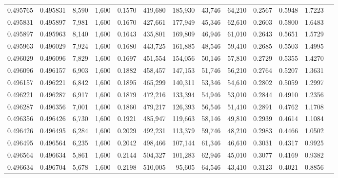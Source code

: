 \begin{tabular}{rrrrrrrrrrrrr}
0.495765 & 0.495831 &  8,590 & 1,600 &                                     0.1570 & 419,680 & 185,930 &  43,746 &  64,210 & 0.2567 & 0.5948 & 1.7223 \\
0.495831 & 0.495897 &  7,981 & 1,600 &                                     0.1670 & 427,661 & 177,949 &  45,346 &  62,610 & 0.2603 & 0.5800 & 1.6483 \\
0.495897 & 0.495963 &  8,140 & 1,600 &                                     0.1643 & 435,801 & 169,809 &  46,946 &  61,010 & 0.2643 & 0.5651 & 1.5729 \\
0.495963 & 0.496029 &  7,924 & 1,600 &                                     0.1680 & 443,725 & 161,885 &  48,546 &  59,410 & 0.2685 & 0.5503 & 1.4995 \\
0.496029 & 0.496096 &  7,829 & 1,600 &                                     0.1697 & 451,554 & 154,056 &  50,146 &  57,810 & 0.2729 & 0.5355 & 1.4270 \\
0.496096 & 0.496157 &  6,903 & 1,600 &                                     0.1882 & 458,457 & 147,153 &  51,746 &  56,210 & 0.2764 & 0.5207 & 1.3631 \\
0.496157 & 0.496221 &  6,842 & 1,600 &                                     0.1895 & 465,299 & 140,311 &  53,346 &  54,610 & 0.2802 & 0.5059 & 1.2997 \\
0.496221 & 0.496287 &  6,917 & 1,600 &                                     0.1879 & 472,216 & 133,394 &  54,946 &  53,010 & 0.2844 & 0.4910 & 1.2356 \\
0.496287 & 0.496356 &  7,001 & 1,600 &                                     0.1860 & 479,217 & 126,393 &  56,546 &  51,410 & 0.2891 & 0.4762 & 1.1708 \\
0.496356 & 0.496426 &  6,730 & 1,600 &                                     0.1921 & 485,947 & 119,663 &  58,146 &  49,810 & 0.2939 & 0.4614 & 1.1084 \\
0.496426 & 0.496495 &  6,284 & 1,600 &                                     0.2029 & 492,231 & 113,379 &  59,746 &  48,210 & 0.2983 & 0.4466 & 1.0502 \\
0.496495 & 0.496564 &  6,235 & 1,600 &                                     0.2042 & 498,466 & 107,144 &  61,346 &  46,610 & 0.3031 & 0.4317 & 0.9925 \\
0.496564 & 0.496634 &  5,861 & 1,600 &                                     0.2144 & 504,327 & 101,283 &  62,946 &  45,010 & 0.3077 & 0.4169 & 0.9382 \\
0.496634 & 0.496704 &  5,678 & 1,600 &                                     0.2198 & 510,005 &  95,605 &  64,546 &  43,410 & 0.3123 & 0.4021 & 0.8856 \\

\end{tabular}
